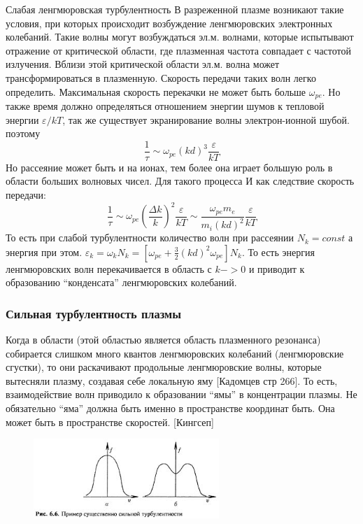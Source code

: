 \documentclass[10pt, a4paper]{article}
\begin{document}
Слабая ленгмюровская турбулентность
В разреженной плазме возникают такие условия, при которых происходит возбуждение ленгмюровских электронных колебаний. Такие волны могут возбуждаться эл.м. волнами, которые испытывают отражение от критической области, где плазменная частота совпадает с частотой излучения. Вблизи этой критической области эл.м. волна может трансформироваться в плазменную. Скорость передачи таких волн легко определить.
Максимальная скорость перекачки не может быть больше $\omega_{pe}$. Но также время должно определяться отношением энергии шумов к тепловой энергии $\varepsilon/kT$, так же существует экранирование волны электрон-ионной шубой. поэтому
\begin{equation}
\frac{1}{\tau} \sim \omega_{pe} (kd)^3 \frac{\varepsilon}{kT}
\end{equation}
Но рассеяние может быть и на ионах, тем более она играет большую роль в области больших волновых чисел. Для такого процесса
И как следствие скорость передачи:
\begin{equation}
\frac{1}{\tau} \sim \omega_{pe} (\frac{\Delta k}{k})^2 \frac{\varepsilon}{kT} \sim  \frac{\omega_{pe} m_e}{m_i (kd)^2}  \frac{\varepsilon}{kT}
\end{equation}
То есть при слабой турбулентности количество волн при рассеянии $N_k =const$ а энергия при этом. $\varepsilon_k = \omega_k N_k = [\omega_{pe} + \frac{3}{2} (kd)^2 \omega_{pe}]N_k$. То есть энергия ленгмюровских волн перекачивается в область с $k->0$ и приводит к образованию “конденсата” ленгмюровских колебаний.
\subsubsection{Сильная турбулентность плазмы}
Когда в области (этой областью является область плазменного резонанса) собирается слишком много квантов ленгмюровских колебаний (ленгмюровские сгустки), то они раскачивают продольные ленгмюровские волны, которые вытесняли плазму, создавая себе локальную яму [Кадомцев стр 266]. То есть, взаимодействие волн приводило к образовании “ямы” в концентрации плазмы.
Не обязательно “яма” должна быть именно в пространстве координат быть. Она может быть в пространстве скоростей. [Кингсеп]
\begin{figure}[ht]
	\begin{center}
		\includegraphics[width=70mm]{Turb_silnaya.JPG}
	\end{center}
\end{figure}
\end{document}
